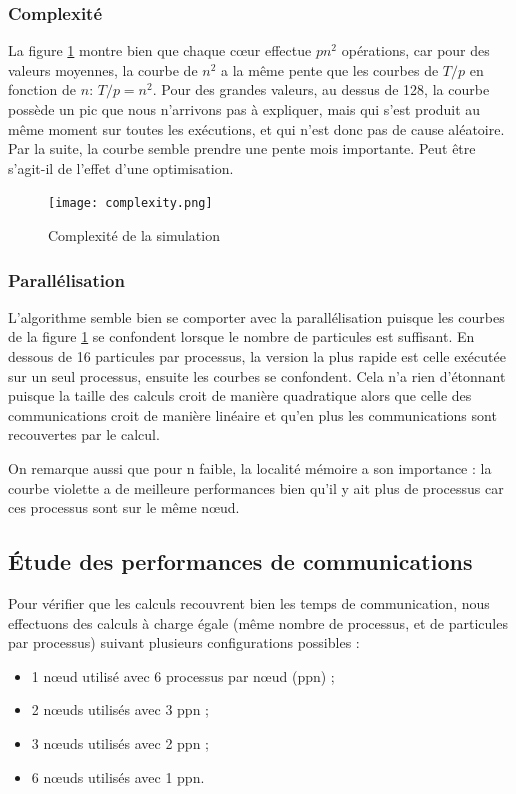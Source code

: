 \subsubsection{Complexité}

La figure \ref{fig:complexity} montre bien que chaque c\oe ur effectue $pn^2$ opérations, car pour des valeurs moyennes, la courbe de $n^2$ a la même pente que les courbes de $T/p$ en fonction de $n$: $T/p = n^2$. Pour des grandes valeurs, au dessus de 128, la courbe possède un pic que nous n'arrivons pas à expliquer, mais qui s'est produit au même moment sur toutes les exécutions, et qui n'est donc pas de cause aléatoire. Par la suite, la courbe semble prendre une pente mois importante. Peut être s'agit-il de l'effet d'une optimisation.

\begin{figure}
\centering
\texttt{[image: complexity.png]}
\caption{Complexité de la simulation}
\label{fig:complexity}
\end{figure}


\subsubsection{Parallélisation}

L'algorithme semble bien se comporter avec la parallélisation puisque les courbes de la figure \ref{fig:complexity} se confondent lorsque le nombre de particules est suffisant. En dessous de 16 particules par processus, la version la plus rapide est celle exécutée sur un seul processus, ensuite les courbes se confondent. Cela n'a rien d'étonnant puisque la taille des calculs croit de manière quadratique alors que celle des communications croit de manière linéaire et qu'en plus les communications sont recouvertes par le calcul.

On remarque aussi que pour n faible, la localité mémoire a son importance : la courbe violette a de meilleure performances bien qu'il y ait plus de processus car ces processus sont sur le même n\oe ud.


\subsection{\'Etude des performances de communications}

Pour vérifier que les calculs recouvrent bien les temps de communication, nous effectuons des calculs à charge égale (même nombre de processus, et de particules par processus) suivant plusieurs configurations possibles : 
\begin{itemize}
\item 1 n\oe ud utilisé avec 6 processus par n\oe ud (ppn) ;
\item 2 n\oe uds utilisés avec 3 ppn ;
\item 3 n\oe uds utilisés avec 2 ppn ;
\item 6 n\oe uds utilisés avec 1 ppn.
\end{itemize}

